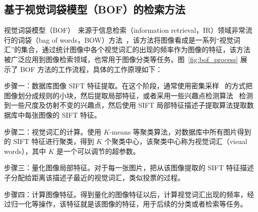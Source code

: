 \subsection{基于视觉词袋模型（BOF）的检索方法}
视觉词袋模型（BOF）~\cite{OHara2011IntroductionTT,Nowak2006SamplingSF,Yang2007EvaluatingBR}来源于信息检索（information retrieval，IR）领域非常流行的词袋（bag of words，BOW）方法~\cite{manning2008introduction,Salton1975AVS}，该方法将图像看成是一系列“视觉词汇”的集合，通过统计图像中各个视觉词汇的出现的频率作为图像的特征，该方法被广泛应用到图像检索领域，也常用于图像分类等任务。图~\ref{fig:bof_process} 展示了 BOF 方法的工作流程，具体的工作原理如下：

步骤一：数据库图像 SIFT 特征提取。在这个阶段，通常使用密集采样~\cite{Vogel2004NaturalSR,FeiFei2005ABH} 的方式把图像划分成规则的小块，然后提取局部特征，或者采用一些兴趣点检测算法~\cite{Mikolajczyk2004ScaleA} 检测到一些尺度及仿射不变的兴趣点，然后使用 SIFT 局部特征描述子提取算法提取数据库中每张图像的 SIFT 特征。

步骤二：视觉词汇的计算。使用 $K$-means 等聚类算法，对数据库中所有图片得到的 SIFT 特征进行聚类，得到 $K$ 个聚类中心，该聚类中心称为视觉词汇（visual words），其中 $K$ 是一个可以调节的超参数。

步骤三：量化图像局部特征。对于每一张图片，把从该图像提取的 SIFT 特征描述子分配给距离该描述子最近的视觉词汇，类似投票的过程。

步骤四：计算图像特征。得到量化的图像特征以后，计算视觉词汇出现的频率，经过归一化等操作，该特征就是该图像的特征，用于后续的分类或者检索等任务。

